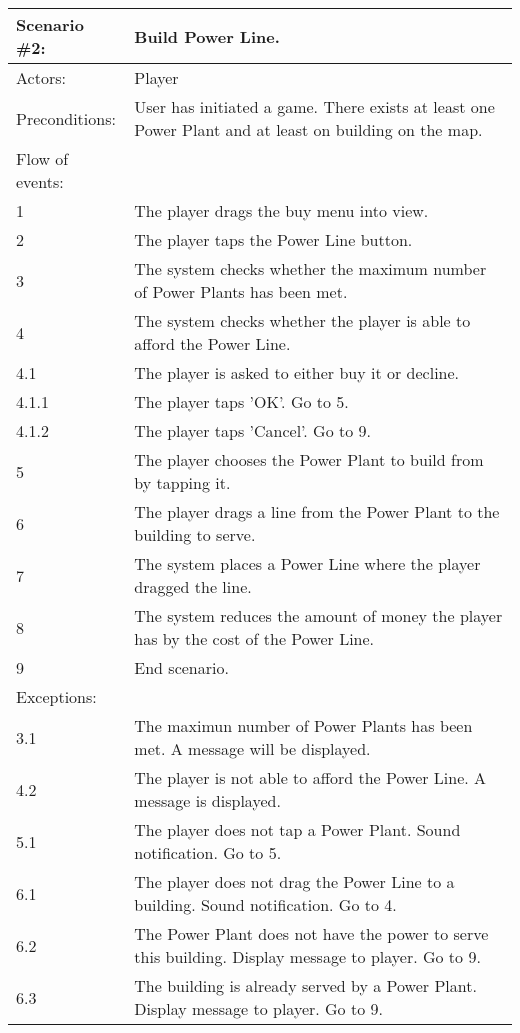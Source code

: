 \begin{tabular}{| l | p{10cm} |}
	\hline
	\rowcolor{lightgray}
	{\bf Scenario \#2:} & {\bf Build Power Line.} \\ \hline
	Actors: & Player \\ \hline
	Preconditions: & User has initiated a game. There exists at least one Power Plant and at least on building on the map. \\ \hline
	Flow of events: & \\ \hline
	1 & The player drags the buy menu into view. \\ \hline
	2 & The player taps the Power Line button. \\ \hline
	3 & The system checks whether the maximum number of Power Plants has been met. \\ \hline
	4 & The system checks whether the player is able to afford the Power Line. \\ \hline
	4.1 & The player is asked to either buy it or decline. \\ \hline
	4.1.1 & The player taps 'OK'. Go to 5. \\ \hline
	4.1.2 & The player taps 'Cancel'. Go to 9. \\ \hline
	5 & The player chooses the Power Plant to build from by tapping it. \\ \hline
	6 & The player drags a line from the Power Plant to the building to serve. \\ \hline
	7 & The system places a Power Line where the player dragged the line. \\ \hline
	8 & The system reduces the amount of money the player has by the cost of the Power Line. \\ \hline
	9 & End scenario. \\ \hline
	Exceptions: & \\ \hline
	3.1 & The maximun number of Power Plants has been met. A message will be displayed. \\ \hline
	4.2 & The player is not able to afford the Power Line. A message is displayed. \\ \hline
	5.1 & The player does not tap a Power Plant. Sound notification. Go to 5. \\ \hline
	6.1 & The player does not drag the Power Line to a building. Sound notification. Go to 4. \\ \hline
	6.2 & The Power Plant does not have the power to serve this building. Display message to player. Go to 9. \\ \hline
	6.3 & The building is already served by a Power Plant. Display message to player. Go to 9. \\ \hline
\end{tabular}

